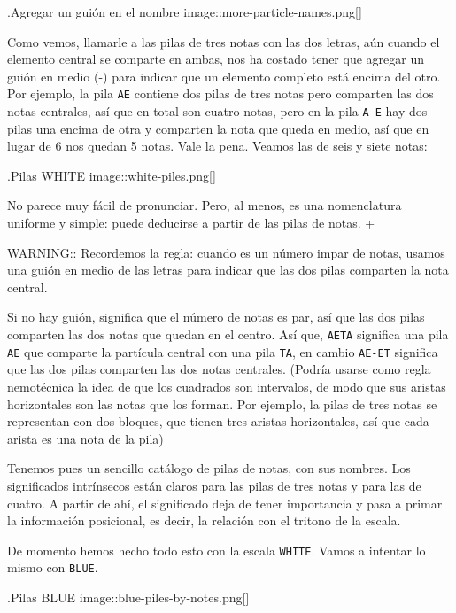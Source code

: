 \documentclass[]{article}
\begin{document}
.Agregar un guión en el nombre image::more-particle-names.png{[}{]}

Como vemos, llamarle a las pilas de tres notas con las dos letras, aún cuando el elemento central se comparte en ambas, nos ha costado tener que agregar un guión en medio (-) para indicar que un elemento completo está encima del otro. Por ejemplo, la pila \texttt{AE} contiene dos pilas de tres notas pero comparten las dos notas centrales, así que en total son cuatro notas, pero en la pila \texttt{A-E} hay dos pilas una encima de otra y comparten la nota que queda en medio, así que en lugar de 6 nos quedan 5 notas. Vale la pena. Veamos las de seis y siete notas:

.Pilas WHITE image::white-piles.png{[}{]}

No parece muy fácil de pronunciar. Pero, al menos, es una nomenclatura uniforme y simple: puede deducirse a partir de las pilas de notas. +

WARNING:: Recordemos la regla: cuando es un número impar de notas, usamos una guión en medio de las letras para indicar que las dos pilas comparten la nota central.

Si no hay guión, significa que el número de notas es par, así que las dos pilas comparten las dos notas que quedan en el centro. Así que, \texttt{AETA} significa una pila \texttt{AE} que comparte la partícula central con una pila \texttt{TA}, en cambio \texttt{AE-ET} significa que las dos pilas comparten las dos notas centrales. (Podría usarse como regla nemotécnica la idea de que los cuadrados son intervalos, de modo que sus aristas horizontales son las notas que los forman. Por ejemplo, la pilas de tres notas se representan con dos bloques, que tienen tres aristas horizontales, así que cada arista es una nota de la pila)

Tenemos pues un sencillo catálogo de pilas de notas, con sus nombres. Los significados intrínsecos están claros para las pilas de tres notas y para las de cuatro. A partir de ahí, el significado deja de tener importancia y pasa a primar la información posicional, es decir, la relación con el tritono de la escala.

De momento hemos hecho todo esto con la escala \texttt{WHITE}. Vamos a intentar lo mismo con \texttt{BLUE}.

.Pilas BLUE image::blue-piles-by-notes.png{[}{]}
\end{document}
